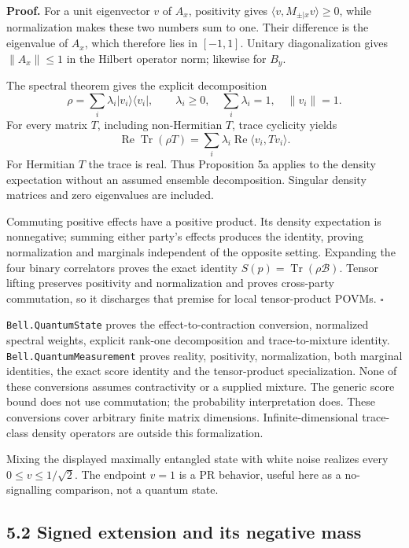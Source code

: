 \documentclass[
]{article}
\begin{document}
\textbf{Proof.} For a unit eigenvector \(v\) of \(A_x\), positivity gives \(\langle v,M_{\pm|x}v\rangle\ge0\), while normalization makes these two numbers sum to one. Their difference is the eigenvalue of \(A_x\), which therefore lies in \([-1,1]\). Unitary diagonalization gives \(\|A_x\|\le1\) in the Hilbert operator norm; likewise for \(B_y\).

The spectral theorem gives the explicit decomposition
\[
\rho=\sum_i\lambda_i|v_i\rangle\langle v_i|,
\qquad \lambda_i\ge0,\quad \sum_i\lambda_i=1,\quad \|v_i\|=1.
\]
For every matrix \(T\), including non-Hermitian \(T\), trace cyclicity yields
\[
\operatorname{Re}\operatorname{Tr}(\rho T)
=\sum_i\lambda_i\operatorname{Re}\langle v_i,Tv_i\rangle.
\]
For Hermitian \(T\) the trace is real. Thus Proposition 5a applies to the density expectation without an assumed ensemble decomposition. Singular density matrices and zero eigenvalues are included.

Commuting positive effects have a positive product. Its density expectation is nonnegative; summing either party's effects produces the identity, proving normalization and marginals independent of the opposite setting. Expanding the four binary correlators proves the exact identity \(S(p)=\operatorname{Tr}(\rho\mathcal B)\). Tensor lifting preserves positivity and normalization and proves cross-party commutation, so it discharges that premise for local tensor-product POVMs. \(\square\)

\texttt{Bell.QuantumState} proves the effect-to-contraction conversion, normalized spectral weights, explicit rank-one decomposition and trace-to-mixture identity. \texttt{Bell.QuantumMeasurement} proves reality, positivity, normalization, both marginal identities, the exact score identity and the tensor-product specialization. None of these conversions assumes contractivity or a supplied mixture. The generic score bound does not use commutation; the probability interpretation does. These conversions cover arbitrary finite matrix dimensions. Infinite-dimensional trace-class density operators are outside this formalization.

Mixing the displayed maximally entangled state with white noise realizes every \(0\le v\le1/\sqrt2\). The endpoint \(v=1\) is a PR behavior, useful here as a no-signalling comparison, not a quantum state.

\subsection{5.2 Signed extension and its negative mass}\label{signed-extension-and-its-negative-mass}
\end{document}
